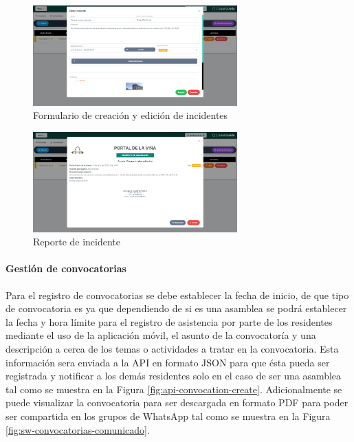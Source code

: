 \begin{figure}[H]
    \centering
    \includegraphics[width=0.7\textwidth]{resources/images/sw-guard-incidents-form}
    \caption{Formulario de creación y edición de incidentes}
    \label{fig:sw-guard-incident-form}
\end{figure}

\begin{figure}[H]
    \centering
    \includegraphics[width=0.7\textwidth]{resources/images/sw-guard-incidents-report}
    \caption{Reporte de incidente}
    \label{fig:sw-guard-incidents-report}
\end{figure}

\paragraph{Gestión de convocatorias}

Para el registro de convocatorias se debe establecer la fecha de inicio, de que tipo de convocatoria es ya que dependiendo de si es una asamblea se podrá establecer la fecha y hora límite para el registro de asistencia por parte de los residentes mediante el uso de la aplicación móvil, el asunto de la convocatoría y una descripción a cerca de los temas o actividades a tratar en la convocatoria.
Esta información sera enviada a la API en formato JSON para que ésta pueda ser registrada y notificar a los demás residentes solo en el caso de ser una asamblea tal como se muestra en la Figura \ref{fig:api-convocation-create}.
Adicionalmente se puede visualizar la convocatoria para ser descargada en formato PDF para poder ser compartida en los grupos de WhatsApp tal como se muestra en la Figura \ref{fig:sw-convocatorias-comunicado}.


